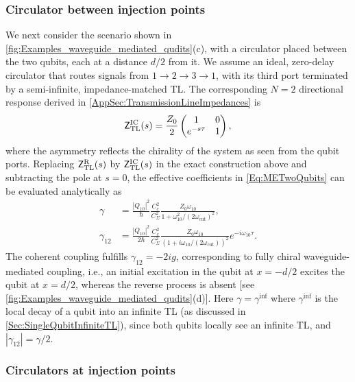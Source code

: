 \documentclass[prx,aps,twocolumn,article]{revtex4-2}
\newcommand{\msf}[1]{\mathsf{#1}}
\newcommand{\msZ}{\msf{Z}}
\newcommand{\msZTL}{\msZ_{\mathrm{TL}}}
\newcommand{\wcut}{\omega_{\text{cut}}}
\begin{document}
\subsubsection{Circulator between injection points}
\label{Subsubsec:CirculatorInbetween}

We next consider the scenario shown in
\cref{fig:Examples_waveguide_mediated_qudits}(c), with a circulator placed
between the two qubits, each at a distance $d/2$ from it. We assume an
ideal, zero-delay circulator that routes signals from
$1\rightarrow2\rightarrow3\rightarrow1$, with its third port terminated
by a semi-infinite, impedance-matched \gls{TL}. The corresponding $N=2$ directional response derived in
\cref{AppSec:TransmissionLineImpedances} is
\begin{align}
    \msZTL^{\rm IC}(s)
    =
    \frac{Z_0}{2}
    \begin{pmatrix}
        1 & 0\\
        e^{-s \tau} & 1
    \end{pmatrix},
\end{align}
where the asymmetry reflects the chirality of the system as seen from the
qubit ports. Replacing $\msZTL^{\rm R}(s)$ by $\msZTL^{\rm IC}(s)$ in the exact construction above and subtracting the pole at $s=0$, the effective
coefficients in \cref{Eq:METwoQubits} can be evaluated analytically as
\begin{align}
\gamma
&=
\frac{|Q_{10}|^2}{\hbar}
\frac{C_c^2}{C_\Sigma^2}
\frac{
    Z_0\omega_{10}
}{
    1+\omega_{10}^2/(2\wcut)^2
},
\\
\gamma_{12}
&=
\frac{|Q_{10}|^2}{2\hbar}
\frac{C_c^2}{C_\Sigma^2}
\frac{
    Z_0\omega_{10}
}{
    \left(
        1+i\omega_{10}/(2\wcut)
    \right)^2
}
e^{-i\omega_{10}\tau}.
\end{align}
The coherent coupling fulfills $\gamma_{12}=-2ig$, corresponding to fully
chiral waveguide-mediated coupling, i.e., an initial excitation in the
qubit at $x=-d/2$ excites the qubit at $x=d/2$, whereas the reverse
process is absent [see 
\cref{fig:Examples_waveguide_mediated_qudits}(d)]. Here
$\gamma=\gamma^{\mathrm{inf}}$ where $\gamma^{\mathrm{inf}}$ is the local decay of a qubit into an infinite \gls{TL} (as discussed in  \cref{Sec:SingleQubitInfiniteTL}), since both
qubits locally see an infinite \gls{TL}, and $|\gamma_{12}|=\gamma/2$.


\subsubsection{Circulators at injection points}
\end{document}
